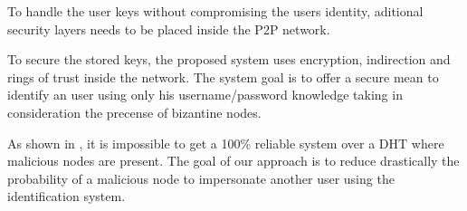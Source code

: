 To handle the user keys without compromising the users identity, aditional
security layers needs to be placed inside the P2P network.

To secure the stored keys, the proposed system uses encryption, indirection and
rings of trust inside the network. The system goal is to offer a secure mean to
identify an user using only his username/password knowledge taking in
consideration the precense of bizantine nodes.

As shown in \cite{the_sybil_attack}, it is impossible to get a 100\% reliable
system over a DHT where malicious nodes are present. The goal of our approach
is to reduce drastically the probability of a malicious node to impersonate
another user using the identification system.
